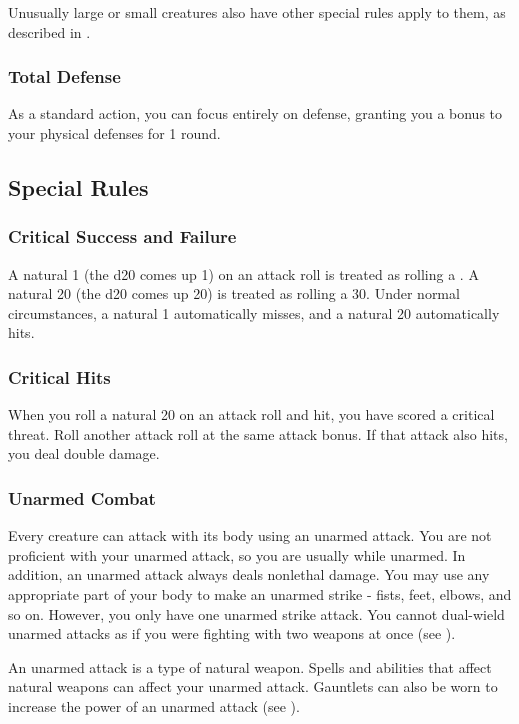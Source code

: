 Unusually large or small creatures also have other special rules apply to them, as described in .

\subsubsection{Total Defense}\label{Total Defense}
As a standard action, you can focus entirely on defense, granting you a  bonus to your physical defenses for 1 round.

\subsection{Special Rules}\label{Special Rules}

\subsubsection{Critical Success and Failure}\label{Critical Success and Failure}
A natural 1 (the d20 comes up 1) on an attack roll is treated as rolling a .
A natural 20 (the d20 comes up 20) is treated as rolling a 30.
Under normal circumstances, a natural 1 automatically misses, and a natural 20 automatically hits.

\subsubsection{Critical Hits}\label{Critical Hits}
When you roll a natural 20 on an attack roll and hit, you have scored a critical threat.
Roll another attack roll at the same attack bonus.
If that attack also hits, you deal double damage.

\subsubsection{Unarmed Combat}\label{Unarmed Combat}
Every creature can attack with its body using an unarmed attack.
You are not proficient with your unarmed attack, so you are usually  while unarmed.
In addition, an unarmed attack always deals nonlethal damage.
You may use any appropriate part of your body to make an unarmed strike - fists, feet, elbows, and so on.
However, you only have one unarmed strike attack.
You cannot dual-wield unarmed attacks as if you were fighting with two weapons at once (see ).

An unarmed attack is a type of natural weapon.
Spells and abilities that affect natural weapons can affect your unarmed attack.
Gauntlets can also be worn to increase the power of an unarmed attack (see ).

